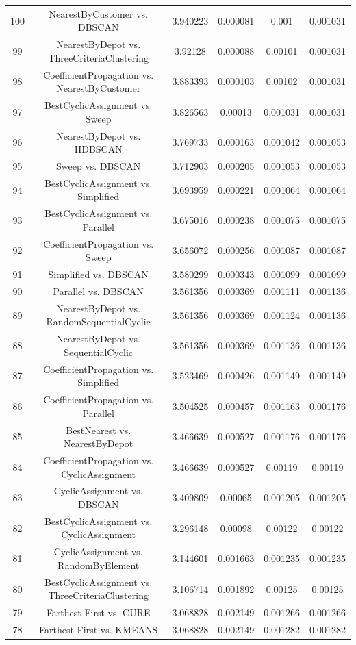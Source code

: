 \documentclass[a4paper,10pt]{article}
\begin{document}
\begin{landscape}
\begin{table}[!htp]
\begin{tabular}{cccccc}
100&NearestByCustomer vs. DBSCAN&3.940223&0.000081&0.001&0.001031\\
99&NearestByDepot vs. ThreeCriteriaClustering&3.92128&0.000088&0.00101&0.001031\\
98&CoefficientPropagation vs. NearestByCustomer&3.883393&0.000103&0.00102&0.001031\\
97&BestCyclicAssignment vs. Sweep&3.826563&0.00013&0.001031&0.001031\\
96&NearestByDepot vs. HDBSCAN&3.769733&0.000163&0.001042&0.001053\\
95&Sweep vs. DBSCAN&3.712903&0.000205&0.001053&0.001053\\
94&BestCyclicAssignment vs. Simplified&3.693959&0.000221&0.001064&0.001064\\
93&BestCyclicAssignment vs. Parallel&3.675016&0.000238&0.001075&0.001075\\
92&CoefficientPropagation vs. Sweep&3.656072&0.000256&0.001087&0.001087\\
91&Simplified vs. DBSCAN&3.580299&0.000343&0.001099&0.001099\\
90&Parallel vs. DBSCAN&3.561356&0.000369&0.001111&0.001136\\
89&NearestByDepot vs. RandomSequentialCyclic&3.561356&0.000369&0.001124&0.001136\\
88&NearestByDepot vs. SequentialCyclic&3.561356&0.000369&0.001136&0.001136\\
87&CoefficientPropagation vs. Simplified&3.523469&0.000426&0.001149&0.001149\\
86&CoefficientPropagation vs. Parallel&3.504525&0.000457&0.001163&0.001176\\
85&BestNearest vs. NearestByDepot&3.466639&0.000527&0.001176&0.001176\\
84&CoefficientPropagation vs. CyclicAssignment&3.466639&0.000527&0.00119&0.00119\\
83&CyclicAssignment vs. DBSCAN&3.409809&0.00065&0.001205&0.001205\\
82&BestCyclicAssignment vs. CyclicAssignment&3.296148&0.00098&0.00122&0.00122\\
81&CyclicAssignment vs. RandomByElement&3.144601&0.001663&0.001235&0.001235\\
80&BestCyclicAssignment vs. ThreeCriteriaClustering&3.106714&0.001892&0.00125&0.00125\\
79&Farthest-First vs. CURE&3.068828&0.002149&0.001266&0.001266\\
78&Farthest-First vs. KMEANS&3.068828&0.002149&0.001282&0.001282\\

\end{tabular}
\end{table}
\end{landscape}
\end{document}
